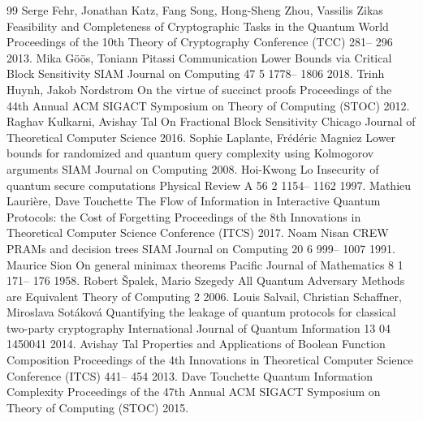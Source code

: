 \documentclass[10pt,a4paper]{article}
\theoremstyle{definition}
\renewcommand{\>}{\rangle}
\newcommand{\<}{\langle}
\begin{document}
\begin{thebibliography}{99}
 Serge Fehr, Jonathan Katz, Fang Song, Hong-Sheng Zhou, Vassilis Zikas Feasibility and Completeness of Cryptographic Tasks in the Quantum World Proceedings of the 10th Theory of Cryptography Conference ({TCC}) 281-- 296 2013.
 Mika Göös, Toniann Pitassi Communication Lower Bounds via Critical Block Sensitivity {SIAM} Journal on Computing 47 5 1778-- 1806 2018.
 Trinh Huynh, Jakob Nordstrom On the virtue of succinct proofs Proceedings of the 44th Annual {ACM} {SIGACT} Symposium on Theory of Computing ({STOC}) 2012.
 Raghav Kulkarni, Avishay Tal On Fractional Block Sensitivity Chicago Journal of Theoretical Computer Science 2016.
 Sophie Laplante, Frédéric Magniez Lower bounds for randomized and quantum query complexity using {K}olmogorov arguments {SIAM} Journal on Computing 2008.
 Hoi-Kwong Lo Insecurity of quantum secure computations Physical Review A 56 2 1154-- 1162 1997.
 Mathieu Laurière, Dave Touchette The Flow of Information in Interactive Quantum Protocols: the Cost of Forgetting Proceedings of the 8th Innovations in Theoretical Computer Science Conference ({ITCS}) 2017.
 Noam Nisan CREW PRAMs and decision trees {SIAM} Journal on Computing 20 6 999-- 1007 1991.
 Maurice Sion On general minimax theorems Pacific Journal of Mathematics 8 1 171-- 176 1958.
 Robert {Š}palek, Mario Szegedy All Quantum Adversary Methods are Equivalent Theory of Computing 2 2006.
 Louis Salvail, Christian Schaffner, Miroslava Sot{á}kov{á} Quantifying the leakage of quantum protocols for classical two-party cryptography International Journal of Quantum Information 13 04 1450041 2014.
 Avishay Tal Properties and Applications of Boolean Function Composition Proceedings of the 4th Innovations in Theoretical Computer Science Conference ({ITCS}) 441-- 454 2013.
 Dave Touchette Quantum Information Complexity Proceedings of the 47th Annual {ACM} {SIGACT} Symposium on Theory of Computing ({STOC}) 2015.
\end{thebibliography}
\end{document}
